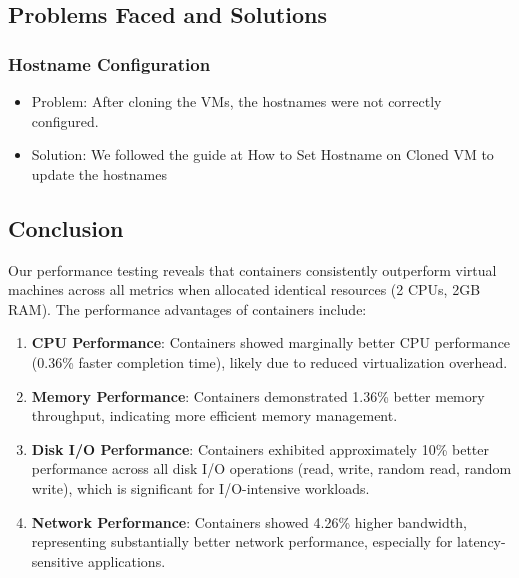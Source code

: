 \hypertarget{problems-faced-and-solutions}{%
\subsection{Problems Faced and
Solutions}\label{problems-faced-and-solutions}}

\hypertarget{hostname-configuration}{%
\subsubsection{Hostname Configuration}\label{hostname-configuration}}

\begin{itemize}
\tightlist
\item
  Problem: After cloning the VMs, the hostnames were not correctly
  configured.
\item
  Solution: We followed the guide at How to Set Hostname on Cloned VM to
  update the hostnames
\end{itemize}

\hypertarget{conclusion}{%
\subsection{Conclusion}\label{conclusion}}

Our performance testing reveals that containers consistently outperform
virtual machines across all metrics when allocated identical resources
(2 CPUs, 2GB RAM). The performance advantages of containers include:

\begin{enumerate}
\def\labelenumi{\arabic{enumi}.}
\item
  \textbf{CPU Performance}: Containers showed marginally better CPU
  performance (0.36\% faster completion time), likely due to reduced
  virtualization overhead.
\item
  \textbf{Memory Performance}: Containers demonstrated 1.36\% better
  memory throughput, indicating more efficient memory management.
\item
  \textbf{Disk I/O Performance}: Containers exhibited approximately 10\%
  better performance across all disk I/O operations (read, write, random
  read, random write), which is significant for I/O-intensive workloads.
\item
  \textbf{Network Performance}: Containers showed 4.26\% higher
  bandwidth, representing substantially better network performance,
  especially for latency-sensitive applications.
\end{enumerate}

